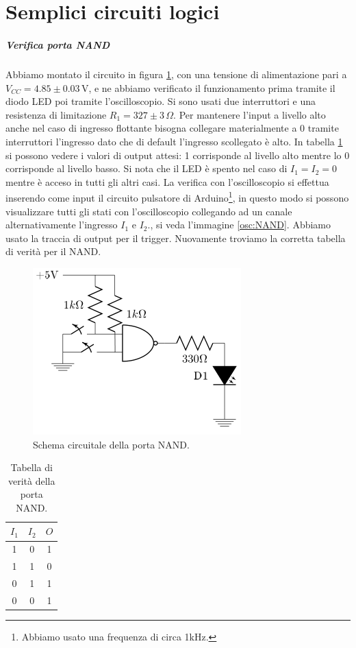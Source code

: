 \documentclass[10pt,a4paper]{article}
\begin{document}
\section{Semplici circuiti logici}
\subparagraph{Verifica porta NAND}
Abbiamo montato il circuito in figura \ref{fig:NAND}, con una tensione di alimentazione pari a $V_{CC}= 4.85\pm0.03\,\text{V}$, e ne abbiamo verificato il funzionamento prima tramite il diodo LED poi tramite l'oscilloscopio. Si sono usati due interruttori e una resistenza di limitazione $R_1=327\pm3\,\Omega$. Per mantenere l'input a livello alto anche nel caso di ingresso flottante bisogna collegare materialmente a 0 tramite interruttori l'ingresso dato che di default l'ingresso scollegato è alto. In tabella \ref{tab:NAND} si possono vedere i valori di output attesi: 1 corrisponde al livello alto mentre lo 0 corrisponde al livello basso. Si nota che il LED è spento nel caso di $I_1=I_2=0$ mentre è acceso in tutti gli altri casi. La verifica con l'oscilloscopio si effettua inserendo come input il circuito pulsatore di Arduino\footnote{Abbiamo usato una frequenza di circa 1kHz.}, in questo modo si possono visualizzare tutti gli stati con l'oscilloscopio collegando ad un canale alternativamente l'ingresso $I_1$ e $I_2$., si veda l'immagine \ref{osc:NAND}. Abbiamo usato la traccia di output per il trigger. Nuovamente troviamo la corretta tabella di verità per il NAND.\\


\begin{figure}[!htb]
  \centering
  \includegraphics[scale=0.5]{nand.png}
\caption{Schema circuitale della porta NAND.\label{fig:NAND}}
\end{figure}

\begin{table}[!htb]
\centering
\begin{tabular}{|c|c|c|}
\hline 
$I_1$ & $I_2$ & $O$ \\
\hline
 1 &  0 & 1\\ 
 
 1 &  1 & 0\\ 

 0 &  1 & 1\\ 
 
 0 &  0 & 1\\ 
\hline 
\end{tabular} 
\caption{Tabella di verità della porta NAND.\label{tab:NAND}}
\end{table}
\end{document}
